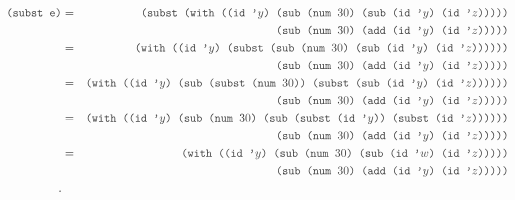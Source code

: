 \begin{eqnarray*}
  \code{(subst e)} &=& \code{(subst (with ((id '$y$) (sub (num $30$) (sub (id '$y$) (id '$z$)))))}\\
  & & \code{(sub (num $30$) (add (id '$y$) (id '$z$)))))}\\
  &=& \code{(with ((id '$y$) (subst (sub (num $30$) (sub (id '$y$) (id '$z$))))))}\\
  & & \code{(sub (num $30$) (add (id '$y$) (id '$z$)))))}\\
  &=& \code{(with ((id '$y$) (sub (subst (num $30$)) (subst (sub (id '$y$) (id '$z$))))))}\\
  & & \code{(sub (num $30$) (add (id '$y$) (id '$z$)))))}\\
  &=& \code{(with ((id '$y$) (sub (num $30$) (sub (subst (id '$y$)) (subst (id '$z$))))))}\\
  & & \code{(sub (num $30$) (add (id '$y$) (id '$z$)))))}\\
  &=& \code{(with ((id '$y$) (sub (num $30$) (sub (id '$w$) (id '$z$)))))}\\
  & & \code{(sub (num $30$) (add (id '$y$) (id '$z$)))))}\\.
\end{eqnarray*}
